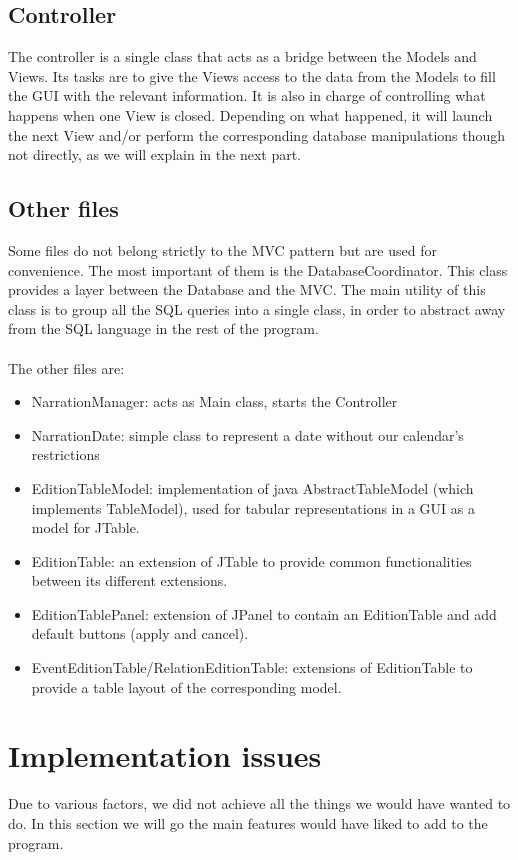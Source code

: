 \documentclass[a4paper ,12pt,french]{article}
\begin{document}
\subsection{Controller}
The controller is a single class that acts as a bridge between the Models and Views. Its tasks are to give the Views access to the data from the Models to fill the GUI with the relevant information. It is also in charge of controlling what happens when one View is closed. Depending on what happened, it will launch the next View and/or perform the corresponding database manipulations though not directly, as we will explain in the next part.

\subsection{Other files}
Some files do not belong strictly to the MVC pattern but are used for convenience. The most important of them is the DatabaseCoordinator. This class provides a layer between the Database and the MVC. The main utility of this class is to group all the SQL queries into a single class, in order to abstract away from the SQL language in the rest of the program. \\ \\
The other files are:
\begin{itemize}
\item NarrationManager: acts as Main class, starts the Controller
\item NarrationDate: simple class to represent a date without our calendar's restrictions
\item EditionTableModel: implementation of java AbstractTableModel (which implements TableModel), used for tabular representations in a GUI as a model for JTable.
\item EditionTable: an extension of JTable to provide common functionalities between its different extensions.
\item EditionTablePanel: extension of JPanel to contain an EditionTable and add default buttons (apply and cancel).
\item EventEditionTable/RelationEditionTable: extensions of EditionTable to provide a table layout of the corresponding model.
\end{itemize}


\section{Implementation issues}
Due to various factors, we did not achieve all the things we would have wanted to do. In this section we will go the main features would have liked to add to the program.
\end{document}

